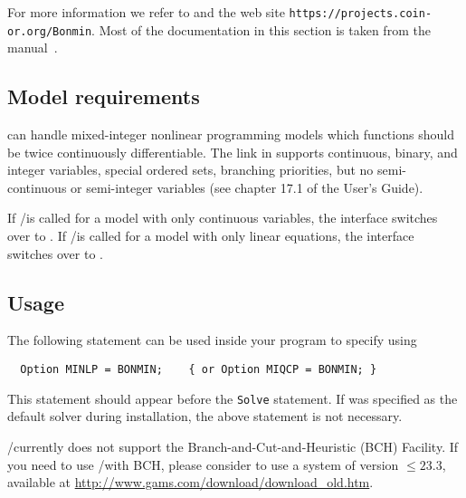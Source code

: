 For more information we refer to \cite{BoGo08,BoKiLi09,BBCCGLLLMSW,BoCoLoMa06} and the \BONMIN web site \texttt{https://projects.coin-or.org/Bonmin}.
Most of the \BONMIN documentation in this section is taken from the \BONMIN manual~\cite{BonminManual}.


\subsection{Model requirements}

\BONMIN can handle mixed-integer nonlinear programming models which functions should be twice continuously differentiable.
The \BONMIN link in \GAMS supports continuous, binary, and integer variables, special ordered sets, branching priorities, but no semi-continuous or semi-integer variables (see chapter 17.1 of the \GAMS User's Guide).

If \GAMS/\BONMIN is called for a model with only continuous variables, the interface switches over to \IPOPT.
If \GAMS/\BONMIN is called for a model with only linear equations, the interface switches over to \CBC.

\subsection{Usage}

The following statement can be used inside your \GAMS program to specify using \BONMIN
\begin{verbatim}
  Option MINLP = BONMIN;    { or Option MIQCP = BONMIN; }
\end{verbatim}
This statement should appear before the \texttt{Solve} statement.
If \BONMIN was specified as the default solver during \GAMS installation, the above statement is not necessary.

\GAMS/\BONMIN currently does not support the \GAMS Branch-and-Cut-and-Heuristic (BCH) Facility.
If you need to use \GAMS/\BONMIN with BCH, please consider to use a \GAMS system of version $\leq 23.3$, available at \url{http://www.gams.com/download/download_old.htm}.

